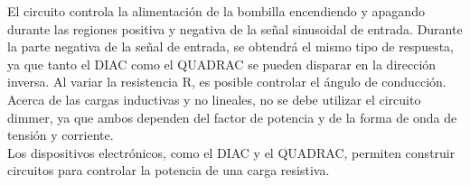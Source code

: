 \documentclass[journal]{IEEEtran}
\begin{document}
El circuito controla la alimentación de la bombilla 
encendiendo y apagando durante las regiones positiva y 
negativa de la señal sinusoidal de entrada. Durante 
la parte negativa de la señal de entrada, se obtendrá 
el mismo tipo de respuesta, ya que tanto el DIAC como 
el QUADRAC se pueden disparar en la dirección inversa. 
Al variar la resistencia R, es posible controlar el
ángulo de conducción.\\

Acerca de las cargas inductivas y no lineales, no se 
debe utilizar el circuito dimmer, ya que ambos dependen 
del factor de potencia y de la forma de onda de tensión 
y corriente. \\

Los dispositivos electrónicos, como el DIAC y el QUADRAC, 
permiten construir circuitos para controlar la potencia 
de una carga resistiva.

\end{document}

